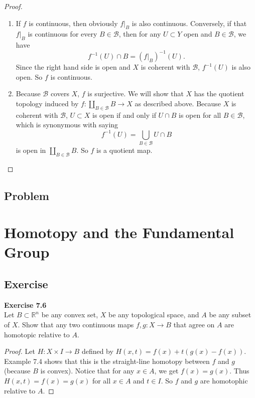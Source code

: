 \documentclass[12pt, a4paper]{article}
\theoremstyle{plain}
\newcommand{\B}{\mathscr{B}}
\newcommand{\R}{\mathbb{R}}
\newenvironment{exercise}[2][Exercise]
    { \begin{mdframed}[backgroundcolor=gray!20] \textbf{#1 #2} \\}
    {  \end{mdframed}}
\begin{document}
\begin{proof}
    \hfill
    \begin{enumerate}[label=(\alph*)]
        \item If $f$ is continuous, then obviously $f|_B$ is also continuous. Conversely, if that $f|_B$ is continuous for every $B\in\B$, then for any $U\subset Y$ open and $B\in\B$, we have
        \[
        f^{-1}(U)\cap B = (f|_B)^{-1}(U).
        \]
        Since the right hand side is open and $X$ is coherent with $\B$, $f^{-1}(U)$ is also open. So $f$ is continuous.

        \item Because $\B$ covers $X$, $f$ is surjective. We will show that $X$ has the quotient topology induced by $f\colon \coprod_{B\in\B}B\to X$ as described above. Because $X$ is coherent with $\B$, $U\subset X$ is open if and only if $U\cap B$ is open for all $B\in\B$, which is synonymous with saying 
        \[
        f^{-1}(U) = \bigcup_{B\in \B}U\cap B
        \]
        is open in $\coprod_{B\in\B}B$. So $f$ is a quotient map.
    \end{enumerate}
\end{proof}

\subsection{Problem}


\setcounter{section}{6}

\section{Homotopy and the Fundamental Group}

\subsection{Exercise}

\begin{exercise}{7.6}
    Let $B\subset \R^n$ be any convex set, $X$ be any topological space, and $A$ be any subset of $X$. Show that any two continuous maps $f,g\colon X\to B$ that agree on $A$ are homotopic relative to $A$.
\end{exercise}
    \begin{proof}
        Let $H:X\times I\to B$ defined by $H(x,t)=f(x)+t(g(x)-f(x))$. Example 7.4 shows that this is the straight-line homotopy between $f$ and $g$ (because $B$ is convex). Notice that for any $x\in A$, we get $f(x)=g(x)$. Thus $H(x,t)=f(x)=g(x)$ for all $x\in A$ and $t\in I$. So $f$ and $g$ are homotophic relative to $A$.
    \end{proof}
\end{document}
